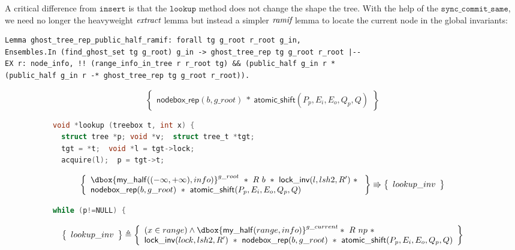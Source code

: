 \documentclass[acmsmall,screen]{acmart}\settopmatter{printfolios=true}
\newcommand\dboxed[1]{\dbox{\ensuremath{#1}}}
\newcommand{\ghost}[2]{\ensuremath{\dboxed{#1}^{#2}}}
\begin{document}
A critical difference from $\texttt{insert}$ is that the $\texttt{lookup}$ method does not change the shape the tree. With the help of the $\texttt{sync\_commit\_same}$, we need no longer the heavyweight $\emph{extract}$ lemma but instead a simpler $\emph{ramif}$ lemma to locate the current node in the global invariants:
\begin{verbatim}
Lemma ghost_tree_rep_public_half_ramif: forall tg g_root r_root g_in,
Ensembles.In (find_ghost_set tg g_root) g_in -> ghost_tree_rep tg g_root r_root |-- 
EX r: node_info, !! (range_info_in_tree r r_root tg) && (public_half g_in r * 
(public_half g_in r -* ghost_tree_rep tg g_root r_root)).
\end{verbatim}

\begin{figure}[htp]
\begin{subfigure}[t]{1\textwidth}
 $$\left\{\begin{array}{l} \mathsf{nodebox\_rep}(b,g\_root)\ *\ \mathsf{atomic\_shift}(P_p,E_i,E_o,Q_p,Q)\end{array}\right\}$$
\begin{lstlisting}[language = C,  numbers = none]
void *lookup (treebox t, int x) {
  struct tree *p; void *v;  struct tree_t *tgt;
  tgt = *t;  void *l = tgt->lock;
  acquire(l);  p = tgt->t;
 \end{lstlisting}  
 $$\left\{\begin{array}{l} \ghost{\mathsf{my\_half}((-\infty,+\infty),info)}{g\_root}\ *\ R\ b\ *\ \mathsf{lock\_inv}(l,lsh2,R')\ *\ \\
 \mathsf{nodebox\_rep}(b,g\_root)\ *\ \mathsf{atomic\_shift}(P_p,E_i,E_o,Q_p,Q)\end{array}\right\} \Rrightarrow \left\{\begin{array}{l} lookup\_inv \end{array}\right\}$$ 
  \begin{lstlisting}[language = C, numbers = none]
    while (p!=NULL) {
       \end{lstlisting}   
   $$\left\{\begin{array}{l} lookup\_inv \end{array}\right\} \triangleq \left\{\begin{array}{l}(x\in range)\land \ghost{\mathsf{my\_half}(range,info)}{g\_current}*\ R\ np\ *\\\mathsf{lock\_inv}(lock,lsh2,R')\ *\ \mathsf{nodebox\_rep}(b,g\_root)\ *\ \mathsf{atomic\_shift}(P_p,E_i,E_o,Q_p,Q)\end{array}\right\}$$

\end{subfigure}
\end{figure}
\end{document}

